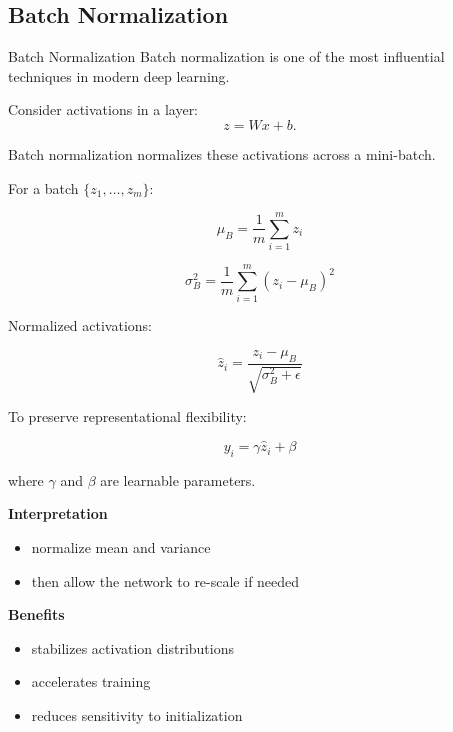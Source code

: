 \documentclass[aspectratio=169,11pt]{beamer}
\begin{document}
\subsection{Batch Normalization}
\begin{frame}[t,allowframebreaks]{Batch Normalization}
\small
Batch normalization is one of the most influential techniques in modern deep learning.

Consider activations in a layer:
\[
z = W x + b.
\]

Batch normalization normalizes these activations across a mini-batch.

For a batch $\{z_1,\dots,z_m\}$:

\[
\mu_B = \frac{1}{m}\sum_{i=1}^m z_i
\]

\[
\sigma_B^2 = \frac{1}{m}\sum_{i=1}^m (z_i-\mu_B)^2
\]

Normalized activations:

\[
\hat{z}_i = \frac{z_i - \mu_B}{\sqrt{\sigma_B^2 + \epsilon}}
\]

To preserve representational flexibility:

\[
y_i = \gamma \hat{z}_i + \beta
\]

where $\gamma$ and $\beta$ are learnable parameters.

\textbf{Interpretation}\\ \begin{itemize}
\item normalize mean and variance
\item then allow the network to re-scale if needed
\end{itemize}

\textbf{Benefits}\\ \begin{itemize}
\item stabilizes activation distributions
\item accelerates training
\item reduces sensitivity to initialization
\end{itemize}
\end{frame}
\end{document}
